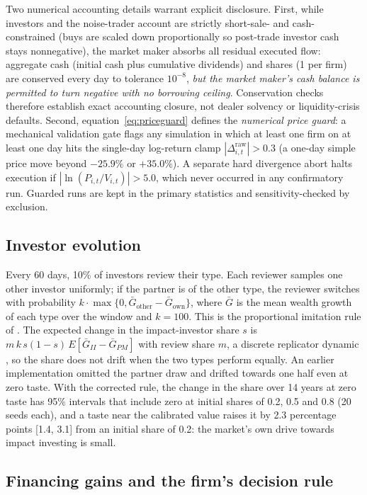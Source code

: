 \documentclass[11pt]{article}
\begin{document}
Two numerical accounting details warrant explicit disclosure. First, while investors and the noise-trader account are strictly short-sale- and cash-constrained (buys are scaled down proportionally so post-trade investor cash stays nonnegative), the market maker absorbs all residual executed flow: aggregate cash (initial cash plus cumulative dividends) and shares (1 per firm) are conserved every day to tolerance $10^{-8}$, \emph{but the market maker's cash balance is permitted to turn negative with no borrowing ceiling}. Conservation checks therefore establish exact accounting closure, not dealer solvency or liquidity-crisis defaults. Second, equation~\eqref{eq:priceguard} defines the \emph{numerical price guard}: a mechanical validation gate flags any simulation in which at least one firm on at least one day hits the single-day log-return clamp $|\Delta^{\text{raw}}_{i,t}| > 0.3$ (a one-day simple price move beyond $-25.9\%$ or $+35.0\%$). A separate hard divergence abort halts execution if $|\ln(P_{i,t}/V_{i,t})| > 5.0$, which never occurred in any confirmatory run. Guarded runs are kept in the primary statistics and sensitivity-checked by exclusion.

\subsection{Investor evolution}

Every 60 days, 10\% of investors review their type. Each reviewer samples one other investor uniformly; if the partner is of the other type, the reviewer switches with probability $k \cdot \max\{0, \bar G_{\text{other}} - \bar G_{\text{own}}\}$, where $\bar G$ is the mean wealth growth of each type over the window and $k = 100$. This is the proportional imitation rule of \citet{schlag1998imitate}. The expected change in the impact-investor share $s$ is $m\,k\,s(1-s)\,E[\bar G_{II} - \bar G_{PM}]$ with review share $m$, a discrete replicator dynamic \citep{taylor1978evolutionary}, so the share does not drift when the two types perform equally. An earlier implementation omitted the partner draw and drifted towards one half even at zero taste. With the corrected rule, the change in the share over 14 years at zero taste has 95\% intervals that include zero at initial shares of 0.2, 0.5 and 0.8 (20 seeds each), and a taste near the calibrated value raises it by 2.3 percentage points [1.4, 3.1] from an initial share of 0.2: the market's own drive towards impact investing is small.

\subsection{Financing gains and the firm's decision rule}
\end{document}
